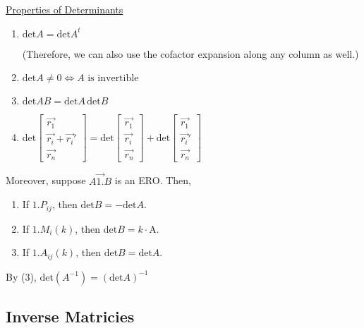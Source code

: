\documentclass[../main.tex]{subfiles}
\begin{document}
\underline{Properties of Determinants}
\begin{enumerate}
    \item \( \text{det} A = \text{det} A^t \)
    
    (Therefore, we can also use the cofactor expansion along any column as well.)
    \item \( \text{det} A \neq 0 \iff A \text{ is invertible} \)
    \item \( \text{det} AB = \text{det} A \, \text{det} B \)
    \item \( \text{det} \begin{bmatrix}
        \vec{r_1} \\
        \vec{r_i}+\vec{r_i}' \\
        \vec{r_n}
    \end{bmatrix}
    = \text{det} \begin{bmatrix}
        \vec{r_1} \\
        \vec{r_i} \\
        \vec{r_n}
    \end{bmatrix}
    + \text{det} \begin{bmatrix}
        \vec{r_1} \\
        \vec{r_i}' \\
        \vec{r_n}
    \end{bmatrix} \)
\end{enumerate}

Moreover, suppose \( A \overrightarrow{1.} B \) is an ERO. Then,
\begin{enumerate}[resume*]
    \item If \( 1. P_{ij} \), then \( \text{det}B = -\text{det}A \).
    \item If \( 1. M_i(k) \), then \( \text{det}B = k\cdot\text{A} \).
    \item If \( 1. A_{ij}(k) \), then \( \text{det}B = \text{det}A \).
\end{enumerate}

\begin{note}
    By (3), \( \text{det}(A^{-1}) = (\text{det}A)^{-1} \)
\end{note}


\subsection{Inverse Matricies}
\end{document}

